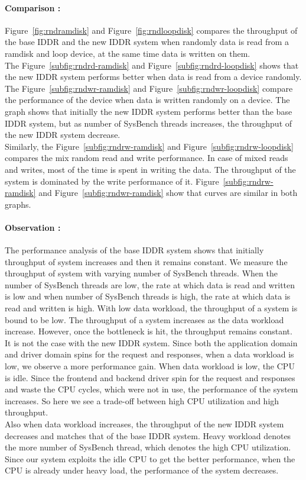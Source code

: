 \paragraph{Comparison :}

Figure~\ref{fig:rndramdisk} and Figure~\ref{fig:rndloopdisk} compares the throughput of the base IDDR and the new IDDR system when randomly data is read from a ramdisk and loop device, at the same time data is written on them.
\\[3mm]
The Figure~\ref{subfig:rndrd-ramdisk} and Figure~\ref{subfig:rndrd-loopdisk} shows that the new IDDR system performs better when data is read from a device randomly.  
\\[3mm]
The Figure~\ref{subfig:rndwr-ramdisk} and Figure~\ref{subfig:rndwr-loopdisk} compare the performance of the device when data is written randomly on a device. The graph shows that initially the new IDDR system performs better than the base IDDR system, but as number of SysBench threads increases, the throughput of the new IDDR system decrease.
\\[3mm] 
Similarly, the Figure~\ref{subfig:rndrw-ramdisk} and Figure~\ref{subfig:rndrw-loopdisk} compares the mix random read and write performance. In case of mixed reads and writes, most of the time is spent in writing the data. The throughput of the system is dominated by the write performance of it. Figure~\ref{subfig:rndrw-ramdisk} and Figure~\ref{subfig:rndwr-ramdisk} show that curves are similar in both graphs. 

\paragraph{Observation :}
The performance analysis of the base IDDR system shows that initially throughput of system increases and then it remains constant. We measure the throughput of system with varying number of SysBench threads. When the number of SysBench threads are low, the rate at which data is read and written is low and when number of SysBench threads is high, the rate at which data is read and written is high. With low data workload, the throughput of a system is bound to be low. The throughput of a system increases as the data workload increase. However, once the bottleneck is hit, the throughput remains constant.
\\[3mm]
It is not the case with the new IDDR system. Since both the application domain and driver domain spins for the request and responses, when a data workload is low, we observe a more performance gain. When data workload is low, the CPU is idle. Since the frontend and backend driver spin for the request and responses and waste the CPU cycles, which were not in use, the performance of the system increases. So here we see a trade-off between high CPU utilization and high throughput. 
\\[3mm]
Also when data workload increases, the throughput of the new IDDR system decreases and matches that of the base IDDR system. Heavy workload denotes the more number of SysBench thread, which denotes the high CPU utilization. Since our system exploits the idle CPU to get the better performance, when the CPU is already under heavy load, the performance of the system decreases.


